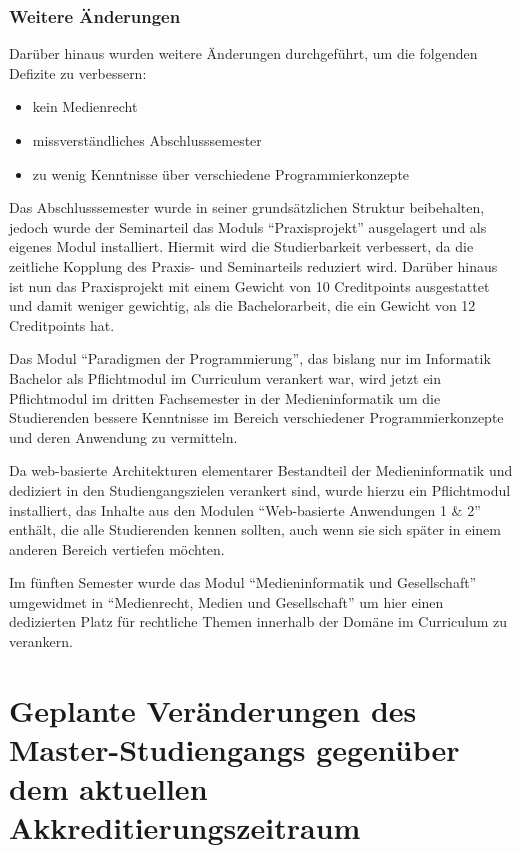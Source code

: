 \subsection{Weitere Änderungen}\label{weitere-uxe4nderungen}

Darüber hinaus wurden weitere Änderungen durchgeführt, um die folgenden
Defizite zu verbessern:

\begin{itemize}
\tightlist
\item
  kein Medienrecht
\item
  missverständliches Abschlusssemester
\item
  zu wenig Kenntnisse über verschiedene Programmierkonzepte
\end{itemize}

Das Abschlusssemester wurde in seiner grundsätzlichen Struktur
beibehalten, jedoch wurde der Seminarteil das Moduls ``Praxisprojekt''
ausgelagert und als eigenes Modul installiert. Hiermit wird die
Studierbarkeit verbessert, da die zeitliche Kopplung des Praxis- und
Seminarteils reduziert wird. Darüber hinaus ist nun das Praxisprojekt
mit einem Gewicht von 10 Creditpoints ausgestattet und damit weniger
gewichtig, als die Bachelorarbeit, die ein Gewicht von 12 Creditpoints
hat.

Das Modul ``Paradigmen der Programmierung'', das bislang nur im
Informatik Bachelor als Pflichtmodul im Curriculum verankert war, wird
jetzt ein Pflichtmodul im dritten Fachsemester in der Medieninformatik
um die Studierenden bessere Kenntnisse im Bereich verschiedener
Programmierkonzepte und deren Anwendung zu vermitteln.

Da web-basierte Architekturen elementarer Bestandteil der
Medieninformatik und dediziert in den Studiengangszielen verankert sind,
wurde hierzu ein Pflichtmodul installiert, das Inhalte aus den Modulen
``Web-basierte Anwendungen 1 \& 2'' enthält, die alle Studierenden
kennen sollten, auch wenn sie sich später in einem anderen Bereich
vertiefen möchten.

Im fünften Semester wurde das Modul ``Medieninformatik und
Gesellschaft'' umgewidmet in ``Medienrecht, Medien und Gesellschaft'' um
hier einen dedizierten Platz für rechtliche Themen innerhalb der Domäne
im Curriculum zu verankern.

\chapter{Geplante Veränderungen des Master-Studiengangs gegenüber dem
aktuellen
Akkreditierungszeitraum}\label{geplante-veruxe4nderungen-des-master-studiengangs-gegenuxfcber-dem-aktuellen-akkreditierungszeitraum}

